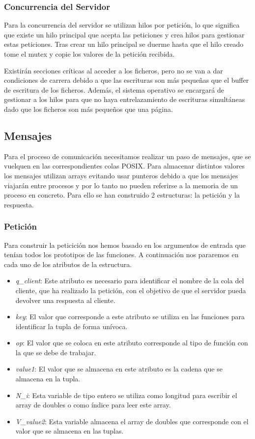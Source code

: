 \documentclass[]{article}
\begin{document}
\subsubsection{Concurrencia del Servidor}
\label{subsec::concurrencia_servidor}
Para la concurrencia del servidor se utilizan hilos por petición, lo que significa que existe un hilo principal que acepta las peticiones y crea hilos para gestionar estas peticiones.
Tras crear un hilo principal se duerme hasta que el hilo creado tome el mutex y copie los valores de la petición recibida.

Existirán secciones críticas al acceder a los ficheros, pero no se van a dar condiciones de carrera debido a que las escrituras son más pequeñas que el buffer de escritura de los ficheros. Además, el sistema operativo se encargará de gestionar a los hilos para que no haya entrelazamiento de escrituras simultáneas dado que los ficheros son más pequeños que una página.
\subsection{Mensajes}
\label{subsec:mensajes}
Para el proceso de comunicación necesitamos realizar un paso de mensajes, que se vuelquen en las correspondientes colas POSIX. Para almacenar distintos valores los mensajes utilizan arrays evitando usar punteros debido a que los mensajes viajarán entre procesos y por lo tanto no pueden referirse a la memoria de un proceso en concreto.
Para ello se han construido 2 estructuras: la petición y la respuesta.

\subsubsection{Petición}
\label{subsec::peticion}
Para construir la peticición nos hemos basado en los argumentos de entrada que tenían todos los prototipos de las funciones. A continuación nos pararemos en cada uno de los atributos de la estructura.

\begin{itemize}
  \item \textit{q\_client}: Este atributo es necesario para identificar el nombre de la cola del cliente, que ha realizado la petición, con el objetivo de que el servidor pueda devolver una respuesta al cliente.
  \item \textit{key}: El valor que corresponde a este atributo se utiliza en las funciones para identificar la tupla de forma unívoca.
  \item \textit{op}: El valor que se coloca en este atributo corresponde al tipo de función con la que se debe de trabajar.
  \item \textit{value1}: El valor que se almacena en este atributo es la cadena que se almacena en la tupla.
  \item \textit{N\_i}: Esta variable de tipo entero se utiliza como longitud para escribir el array de doubles o como índice para leer este array.
 \item \textit{V\_value2}: Esta variable almacena el array de doubles que corresponde con el valor que se almacena en las tuplas.
\end{itemize}
\end{document}
